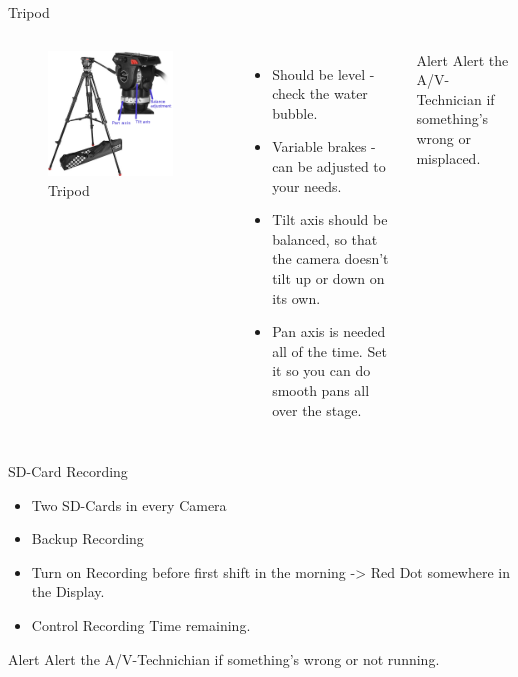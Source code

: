 \documentclass[aspectratio=169]{beamer}
\begin{document}
\begin{frame}{Tripod}
	\begin{columns}[T,onlytextwidth]
	\begin{figure} 
		\centering
		\includegraphics[width=0.9\textwidth]{images/tripod-complete.png}
		\caption{Tripod}
	\end{figure}
	
	\begin{itemize}
			\item Should be level - check the water bubble.
			\item Variable brakes - can be adjusted to your needs.
			\item Tilt axis should be balanced, so that the camera doesn't tilt up or down on its own.
			\item Pan axis is needed all of the time. Set it so you can do smooth pans all over the stage.
		\end{itemize}
		\begin{alertblock}{Alert}
			Alert the A/V-Technician if something's wrong or misplaced.
		\end{alertblock}
	\end{columns}
\end{frame}

\begin{frame}{SD-Card Recording}
		\begin{itemize}
			\item Two SD-Cards in every Camera
			\item Backup Recording
			\item Turn on Recording before first shift in the morning -> Red Dot somewhere in the Display.
			\item Control Recording Time remaining. 
		\end{itemize}
		\begin{alertblock}{Alert}
			Alert the A/V-Technichian if something's wrong or not running.
		\end{alertblock}
\end{frame}
\end{document}
